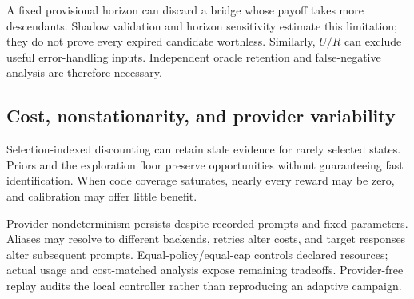\documentclass[final,5p,times,number]{elsarticle}
\begin{document}
A fixed provisional horizon can discard a bridge whose payoff takes more descendants. Shadow validation and horizon sensitivity estimate this limitation; they do not prove every expired candidate worthless. Similarly, $U/R$ can exclude useful error-handling inputs. Independent oracle retention and false-negative analysis are therefore necessary.

\subsection{Cost, nonstationarity, and provider variability}
Selection-indexed discounting can retain stale evidence for rarely selected states. Priors and the exploration floor preserve opportunities without guaranteeing fast identification. When code coverage saturates, nearly every reward may be zero, and calibration may offer little benefit.

Provider nondeterminism persists despite recorded prompts and fixed parameters. Aliases may resolve to different backends, retries alter costs, and target responses alter subsequent prompts. Equal-policy/equal-cap controls declared resources; actual usage and cost-matched analysis expose remaining tradeoffs. Provider-free replay audits the local controller rather than reproducing an adaptive campaign.
\end{document}
